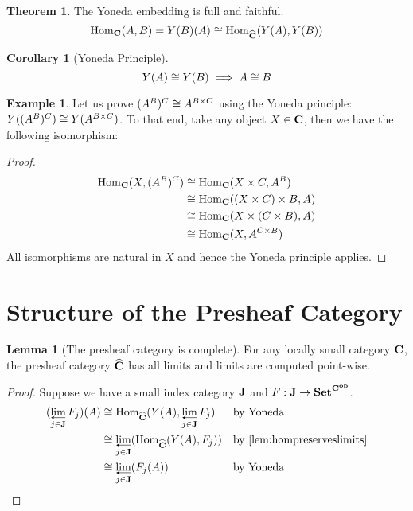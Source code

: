 \documentclass{scrartcl}
\theoremstyle{definition}
\newtheorem{lemma}[definition]{Lemma}
\newtheorem{theorem}[definition]{Theorem}
\newtheorem{corollary}[definition]{Corollary}
\newtheorem{example}[definition]{Example}
\begin{document}
\begin{theorem} The Yoneda embedding is full and faithful.
  $$\mathrm{Hom}_{\mathbf{C}}(A,B) = Y(B)(A) \cong \mathrm{Hom}_{\widehat{\mathbf{C}}}(Y(A),Y(B))$$
\end{theorem}

\begin{corollary}[Yoneda Principle]
  $$Y(A) \cong Y(B) \implies A \cong B$$
\end{corollary}

\begin{example}
  Let us prove $(A^B)^C \cong A^{B \times C}$ using the Yoneda principle: $Y((A^B)^C) \cong Y(A^{B \times C})$.
  To that end, take any object $X \in \mathbf{C}$, then we have the following isomorphism:
\begin{proof}
  \begin{align*}
    \mathrm{Hom}_{\mathbf{C}}(X,(A^B)^C) & \cong \mathrm{Hom}_{\mathbf{C}}(X \times C,A^B) \\
                              & \cong \mathrm{Hom}_{\mathbf{C}}((X \times C) \times B,A) \\
                              & \cong \mathrm{Hom}_{\mathbf{C}}(X \times (C \times B),A) \\
                              & \cong \mathrm{Hom}_{\mathbf{C}}(X,A^{C \times B}) 
  \end{align*}
  All isomorphisms are natural in $X$ and hence the Yoneda principle applies.
\end{proof}
\end{example}

\clearpage
\section{Structure of the Presheaf Category}
\label{sec:structureofpresheafcategory}

\begin{lemma}[The presheaf category is complete]
  For any locally small category $\mathbf{C}$, the presheaf category $\widehat{\mathbf{C}}$ has all limits and limits are computed point-wise.
\begin{proof}
  Suppose we have a small index category $\mathbf{J}$ and $F: \mathbf{J} \to \mathbf{Set}^{\mathbf{C}^{\mathbf{op}}}$.
  \begin{align*}
    (\lim{j \in \Cat{J}}F_j)(A) & \iso \Hom{\Presheaf{\Cat{C}}}{Y(A)}{\lim{j \in \Cat{J}}F_j}   && \text{by Yoneda} \\
                                & \iso \lim{j \in \Cat{J}}(\Hom{\Presheaf{\Cat{C}}}{Y(A)}{F_j}) && \text{by \autoref{lem:hompreserveslimits}} \\
                                & \iso \lim{j \in \Cat{J}}(F_j(A))                 && \text{by Yoneda} \\
  \end{align*}
\end{proof}
\end{lemma}
\end{document}
